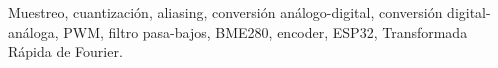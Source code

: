 
\begin{IEEEkeywords}

Muestreo, cuantización, aliasing, conversión análogo-digital, conversión digital-análoga, PWM, filtro pasa-bajos, BME280, encoder, ESP32, Transformada Rápida de Fourier.

\end{IEEEkeywords}
